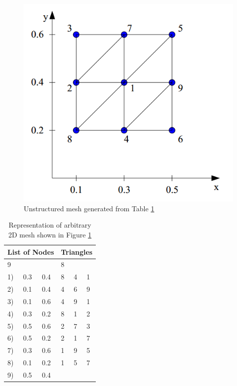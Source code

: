 \documentclass{article}
\begin{document}
\begin{figure}
	\centering
	\includegraphics[scale=0.4]{figures/unstructured-mesh-example.png}
	\caption{Unstructured mesh generated from Table \ref{tab:mesh-representation}}
	\label{fig:mesh-representation}
\end{figure}

\begin{table}
	\label{tab:mesh-representation}
	\centering
	\begin{tabular}{|l|l|l|l|l|l|}
		\hline
		\multicolumn{3}{|c|}{\textbf{List of Nodes}} & \multicolumn{3}{|c|}{\textbf{Triangles}} \\
		\hline
		\multicolumn{3}{|l|}{9} & \multicolumn{3}{|l|}{8} \\
		\hline
		1) & 0.3 & 0.4 & 8 & 4 & 1 \\
		2) & 0.1 & 0.4 & 4 & 6 & 9 \\
		3) & 0.1 & 0.6 & 4 & 9 & 1 \\
		4) & 0.3 & 0.2 & 8 & 1 & 2 \\
		5) & 0.5 & 0.6 & 2 & 7 & 3 \\
		6) & 0.5 & 0.2 & 2 & 1 & 7 \\
		7) & 0.3 & 0.6 & 1 & 9 & 5 \\
		8) & 0.1 & 0.2 & 1 & 5 & 7 \\
		9) & 0.5 & 0.4 & & & \\
		\hline
	\end{tabular}
	\caption{Representation of arbitrary 2D mesh shown in Figure \ref{fig:mesh-representation}}
\end{table}
\end{document}
